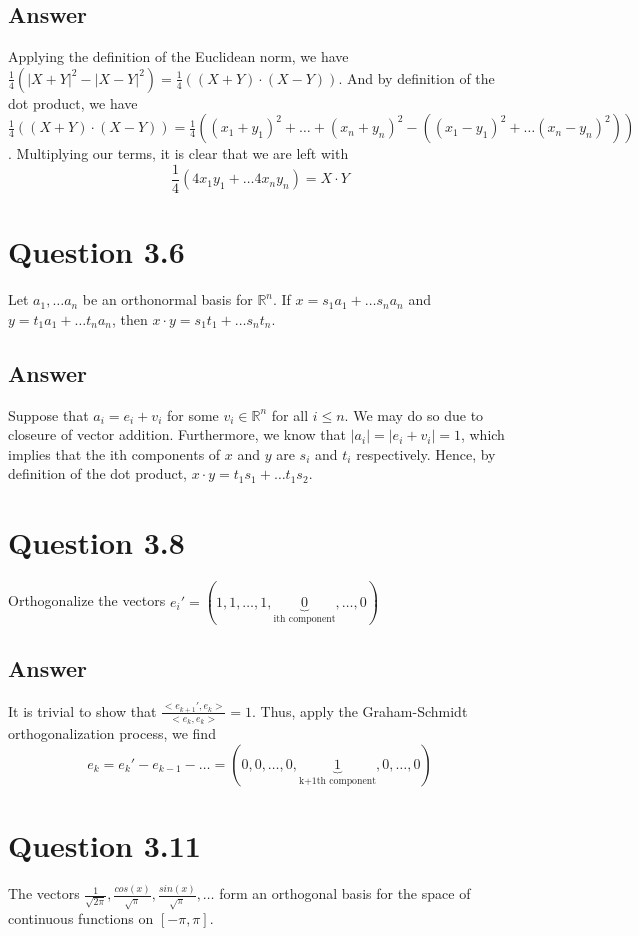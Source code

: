 \documentclass[
	12pt, %
]{fphw}
\begin{document}
\subsection*{Answer}
Applying the definition of the Euclidean norm, we have \\
$\frac{1}{4}(|X+Y|^2-|X-Y|^2) = \frac{1}{4}((X+Y) \cdot (X-Y))$. And by definition of the dot product, we have \\
$\frac{1}{4}((X+Y) \cdot (X-Y)) = \frac{1}{4}((x_1+y_1)^2 + \dots + (x_n+y_n)^2 -((x_1-y_1)^2 + \dots (x_n-y_n)^2))$. 
Multiplying our terms, it is clear that we are left with \\
$$\frac{1}{4}(4x_1y_1 + \dots 4x_ny_n )=X \cdot Y$$
\section*{Question 3.6}
\begin{problem}
	Let $a_1, \dots a_n $ be an orthonormal basis for $\mathbb{R}^n$. If $x=s_1a_1+ \dots s_na_n$ and 
	$y=t_1a_1 + \dots t_na_n$, then $x \cdot y=s_1t_1+ \dots s_nt_n$. 
\end{problem}
\subsection*{Answer}
Suppose that $a_i=e_i+v_i$ for some $v_i \in \mathbb{R}^n$ for all $i\leq n$. We may do so due to closeure of vector addition. 
Furthermore, we know that $|a_i|=|e_i+v_i|=1$, which implies that the ith components of $x$ and $y$ are $s_i$ and $t_i$ respectively. Hence, by definition of the dot product, $x \cdot y = t_1s_1 + \dots t_1s_2$. 
\section*{Question 3.8}
\begin{problem}
	Orthogonalize the vectors $e_i'=(1,1, \dots, 1, \underbrace{0}_{\text{ith component}}, \dots, 0)$ 
\end{problem}
\subsection*{Answer}
It is trivial to show that $\frac{<e_{k+1}', e_k>}{<e_k,e_k>}=1$. Thus, apply the Graham-Schmidt orthogonalization process, we find
$$e_{k}=e_{k}'-e_{k-1}-\dots = (0,0, \dots, 0, \underbrace{1}_{\text{k+1th component}}, 0, \dots, 0)$$
\section*{Question 3.11}
\begin{problem}
	The vectors $\frac{1}{\sqrt{2\pi}}, \frac{cos(x)}{\sqrt{\pi}}, \frac{sin(x)}{\sqrt{\pi}}, \dots $
form an orthogonal basis for the space of continuous functions on $[-\pi,\pi]$.
\end{problem}
\end{document}
